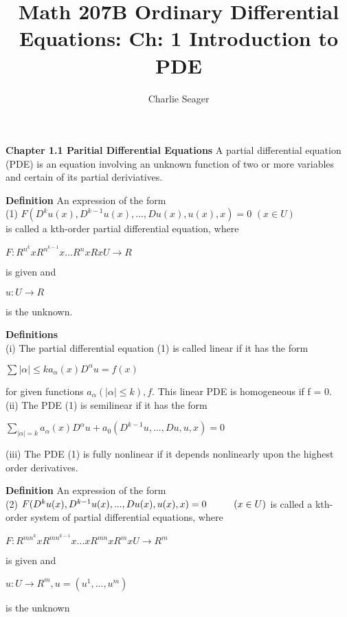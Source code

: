 \documentclass{article}
\newcommand\tab[1][1cm]{\hspace*{#1}}
\begin{document}
\title {Math 207B Ordinary Differential Equations: Ch: 1 Introduction to PDE}

\author{Charlie Seager}

\maketitle

\textbf {Chapter 1.1 Paritial Differential Equations} A partial differential equation (PDE) is an equation involving an unknown function of two or more variables and certain of its partial deriviatives. 

\textbf{Definition} An expression of the form \\
(1) \tab $F(D^k u(x), D^{k-1} u(x),..., Du(x), u(x), x) = 0$ \tab $(x \in U)$ \\
is called a kth-order partial differential equation, where
\begin{center}
$F: R^{n^k} x R^{n^{k-1}} x \dots R^n x R x U \to R$
\end{center}
is given and 
\begin{center}
$u : U \to R$
\end{center}
is the unknown.

\textbf {Definitions} \\
(i) The partial differential equation (1) is called linear if it has the form
\begin{center}
$\sum{|\alpha| \leq k} a_{\alpha}(x) D^{\alpha}u = f(x)$
\end{center}
for given functions $a_{\alpha}(|\alpha| \leq k), f$. This linear PDE is homogeneous if f = 0. \\
(ii) The PDE (1) is semilinear if it has the form
\begin{center}
$\sum_{|\alpha|=k} a_\alpha (x) D^{\alpha} u + a_0 (D^{k-1}u,...,Du,u,x) = 0$
\end{center}
(iii) The PDE (1) is fully nonlinear if it depends nonlinearly upon the highest order derivatives. 

\textbf {Definition} An expression of the form \\
(2) \tab $F(D^k u(x), D^{k-1}u(x),...,Du(x), u(x), x) = 0 \tab (x \in U)$
is called a kth-order system of partial differential equations, where
\begin{center}
$F: R^{{mn}^k} x R^{{mn}^{k-1}} x \dots x R^{mn} x R^m x U \to R^m$
\end{center}
is given and 
\begin{center}
$u : U \to R^m, u = (u^1 ,..., u^m)$
\end{center}
is the unknown
\end{document}
